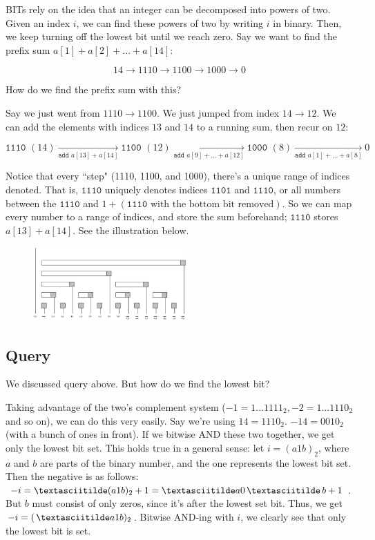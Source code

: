 \documentclass{article}
\begin{document}
    BITs rely on the idea that an integer can be decomposed into powers of two. Given an index $i$, we can find these powers of two by writing $i$ in binary. Then, we keep turning off the lowest bit until we reach zero. Say we want to find the prefix sum $a[1]+a[2]+...+a[14]$:
    
    $$ 14 \rightarrow 1110 \rightarrow 1100 \rightarrow 1000 \rightarrow 0 $$
    
    How do we find the prefix sum with this?
    
    Say we just went from $1110 \rightarrow 1100$. We just jumped from index $14 \rightarrow 12$. We can add the elements with indices $13$ and $14$ to a running sum, then recur on $12$:
    
    $$ \texttt{1110 }(14) \xrightarrow[{\texttt{add } a[13]+a[14]}]{} \texttt{1100 }(12) \xrightarrow[{\texttt{add } a[9]+...+a[12]}]{} \texttt{1000 }(8) \xrightarrow[{\texttt{add } a[1]+...+a[8]}]{} 0 $$
    
    Notice that every ``step" (1110, 1100, and 1000), there's a unique range of indices denoted. That is, $\texttt{1110}$ uniquely denotes indices $\texttt{1101}$ and $\texttt{1110}$, or all numbers between the $\texttt{1110}$ and $1+(\texttt{1110} \text{ with the bottom bit removed})$. So we can map every number to a range of indices, and store the sum beforehand; $\texttt{1110}$ stores $a[13]+a[14]$. See the illustration below.

    \begin{figure}
      \center
      \includegraphics[width=0.525\textwidth]{BIT.PNG}
    \end{figure}
    
    \subsection{Query}
        We discussed query above. But how do we find the lowest bit?
        
        Taking advantage of the two's complement system ($-1 = 1...1111_2, -2 = 1...1110_2$ and so on), we can do this very easily. Say we're using $14 = 1110_2$. $-14 = 0010_2$ (with a bunch of ones in front). If we bitwise AND these two together, we get only the lowest bit set. This holds true in a general sense: let $i = (a1b)_2$, where $a$ and $b$ are parts of the binary number, and the one represents the lowest bit set. Then the negative is as follows: $-i = \textasciitilde(a1b)_2 + 1 = \textasciitilde a0\,\textasciitilde \,b + 1$. But $b$ must consist of only zeros, since it's after the lowest set bit. Thus, we get $-i = (\,\textasciitilde a1b)_2$. Bitwise AND-ing with $i$, we clearly see that only the lowest bit is set.
        
\end{document}
